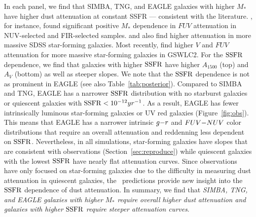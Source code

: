 In each panel, we find that SIMBA, TNG, and EAGLE galaxies with higher
$M_*$ have higher dust attenuation at constant SSFR --- consistent with the literature.
\cite{burgarella2005}, for instance, found significant positive $M_*$
dependence in $FUV$ attenuation in NUV-selected and FIR-selected samples. 
\cite{garn2010} and \cite{battisti2016} also find higher attenuation in
more massive SDSS star-forming galaxies. 
Most recently, \cite{salim2018} find higher $V$ and $FUV$ attenuation for
more massive star-forming galaxies in GSWLC2. 
For the ${\rm SSFR}$ dependence, we find that galaxies with higher ${\rm SSFR}$ have
higher $A_{1500}$ (top) and $A_V$ (bottom) as well as steeper slopes. 
We note that the ${\rm SSFR}$ dependence is not as prominent in EAGLE (see also
Table~\ref{tab:posterior}). 
Compared to SIMBA and TNG, EAGLE has a narrower ${\rm SSFR}$ distribution with no
starburst galaxies or quiescent galaxies with ${\rm SSFR} < 10^{-12}yr^{-1}$. 
As a result, EAGLE has fewer intrinsically luminous star-forming galaxies
or UV red galaxies (Figure~\ref{fig:obs}). 
This means that EAGLE has a narrower intrinsic $g{-}r$ and $FUV{-}NUV$ color
distributions that require an overall attenuation and reddenning less
dependent on ${\rm SSFR}$. 
Nevertheless, in all simulations, star-forming galaxies have slopes that
are consistent with observations (Section~\ref{sec:reproduce}) while
quiescent galaxies with the lowest ${\rm SSFR}$ have nearly flat attenuation
curves. 
Since observations have only focused on star-forming galaxies due to the
difficulty in measuring dust attenuation in quiescent galaxies, the
\eda~predictions provide new insight into the ${\rm SSFR}$ dependence of dust
attenuation. 
In summary, we find that \emph{SIMBA, TNG, and EAGLE galaxies with higher
$M_*$ require overall higher dust attenuation and galaxies with higher
${\rm SSFR}$ require steeper attenuation curves}.
